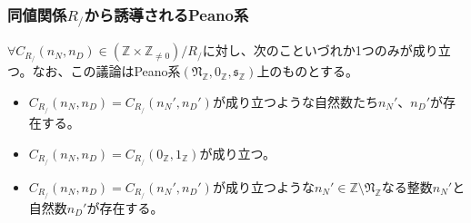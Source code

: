 \documentclass[dvipdfmx]{jsarticle}
\begin{document}
\subsubsection{同値関係$R_{/}$から誘導されるPeano系}%
\begin{thm}\label{1.2.6.11}
$\forall C_{R_{/}}\left( n_{N},n_{D} \right) \in \left( \mathbb{Z} \times \mathbb{Z}_{\neq 0} \right) /R_{/} $に対し、次のこといづれか1つのみが成り立つ。なお、この議論はPeano系$\left( \mathfrak{N}_{\mathbb{Z}},0_{\mathbb{Z}},\mathfrak{s}_{\mathbb{Z}} \right)$上のものとする。
\begin{itemize}
\item
  $C_{R_{/}}\left( n_{N},n_{D} \right) = C_{R_{/}}\left( n_{N}',n_{D}' \right)$が成り立つような自然数たち$n_{N}'$、$n_{D}'$が存在する。
\item
  $C_{R_{/}}\left( n_{N},n_{D} \right) = C_{R_{/}}\left( 0_{\mathbb{Z}},1_{\mathbb{Z}} \right)$が成り立つ。
\item
  $C_{R_{/}}\left( n_{N},n_{D} \right) = C_{R_{/}}\left( n_{N}',n_{D}' \right)$が成り立つような$n_{N}' \in \mathbb{Z} \setminus \mathfrak{N}_{\mathbb{Z}}$なる整数$n_{N}'$と自然数$n_{D}'$が存在する。
\end{itemize}
\end{thm}
\end{document}
